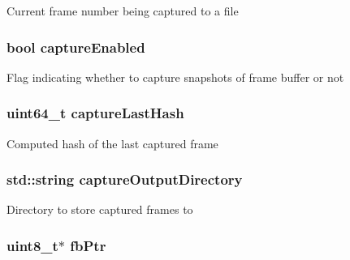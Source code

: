 \label{classVncInput_aad01931dab0d55404625cb7ac28dc350}
Current frame number being captured to a file \hypertarget{classVncInput_af27cd54f88185b0f4376abad3cd1a676}{
\subsubsection[{captureEnabled}]{\setlength{\rightskip}{0pt plus 5cm}bool {\bf captureEnabled}}}
\label{classVncInput_af27cd54f88185b0f4376abad3cd1a676}
Flag indicating whether to capture snapshots of frame buffer or not \hypertarget{classVncInput_abf26b46759231e475b9d70019cdb553b}{
\subsubsection[{captureLastHash}]{\setlength{\rightskip}{0pt plus 5cm}uint64\_\-t {\bf captureLastHash}}}
\label{classVncInput_abf26b46759231e475b9d70019cdb553b}
Computed hash of the last captured frame \hypertarget{classVncInput_a6398d687ee470a89c9104f07e58a877d}{
\subsubsection[{captureOutputDirectory}]{\setlength{\rightskip}{0pt plus 5cm}std::string {\bf captureOutputDirectory}}}
\label{classVncInput_a6398d687ee470a89c9104f07e58a877d}
Directory to store captured frames to \hypertarget{classVncInput_abb84b49d0d59c2601f33b650316a4c50}{
\subsubsection[{fbPtr}]{\setlength{\rightskip}{0pt plus 5cm}uint8\_\-t$\ast$ {\bf fbPtr}}}
\label{classVncInput_abb84b49d0d59c2601f33b650316a4c50}
